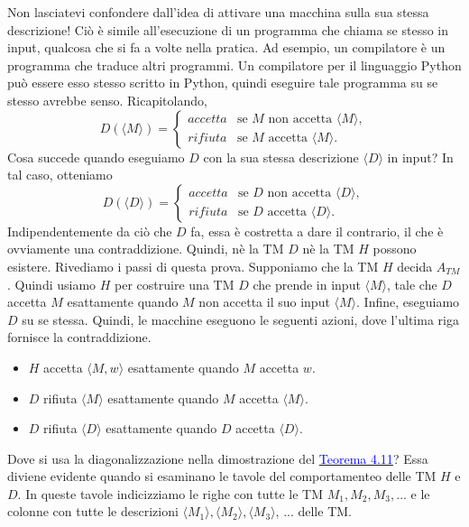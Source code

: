 \documentclass{article}
\begin{document}
Non lasciatevi confondere dall'idea di attivare una macchina sulla sua stessa descrizione!
Ciò è simile all'esecuzione di un programma che chiama se stesso in input, qualcosa che si fa a volte nella pratica.
Ad esempio, un compilatore è un programma che traduce altri programmi.
Un compilatore per il linguaggio Python può essere esso stesso scritto in Python, quindi eseguire tale programma su se stesso avrebbe senso.
Ricapitolando,
$$
D(\langle M \rangle) =
\begin{cases}
    accetta & \text{se } M \text{ non accetta } \langle M \rangle, \\
    rifiuta & \text{se } M \text{ accetta } \langle M \rangle.
\end{cases}
$$
Cosa succede quando eseguiamo $D$ con la sua stessa descrizione $\langle D \rangle$ in input?
In tal caso, otteniamo
$$
D(\langle D \rangle) =
\begin{cases}
    accetta & \text{se } D \text{ non accetta } \langle D \rangle, \\
    rifiuta & \text{se } D \text{ accetta } \langle D \rangle.
\end{cases}
$$
Indipendentemente da ciò che $D$ fa, essa è costretta a dare il contrario, il che è ovviamente una contraddizione.
Quindi, nè la TM $D$ nè la TM $H$ possono esistere.
\vspace{1em}
\newline
Rivediamo i passi di questa prova. Supponiamo che la TM $H$ decida $A_{TM}$.
Quindi usiamo $H$ per costruire una TM $D$ che prende in input $\langle M \rangle$, tale che $D$ accetta $M$ esattamente quando $M$ non accetta il suo input $\langle M \rangle$.
Infine, eseguiamo $D$ su se stessa.
Quindi, le macchine eseguono le seguenti azioni, dove l'ultima riga fornisce la contraddizione.
\begin{itemize}
    \item $H$ accetta $\langle M,w \rangle$ esattamente quando $M$ accetta $w$.
    \item $D$ rifiuta $\langle M \rangle$ esattamente quando $M$ accetta $\langle M \rangle$.
    \item $D$ rifiuta $\langle D \rangle$ esattamente quando $D$ accetta $\langle D \rangle$.
\end{itemize}           
Dove si usa la diagonalizzazione nella dimostrazione del \hyperref[teorema-4.11]{\textcolor{blue}{Teorema 4.11}}?
Essa diviene evidente quando si esaminano le tavole del comportamenteo delle TM $H$ e $D$.
In queste tavole indicizziamo le righe con tutte le TM $M_1,M_2,M_3,...$ e le colonne con tutte le descrizioni $\langle M_1 \rangle, \langle M_2 \rangle, \langle M_3 \rangle$, ... delle TM.
\end{document}
